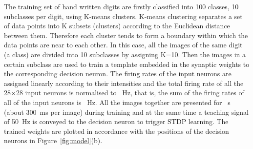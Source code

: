 The training set of \DIFdelbegin {}\DIFdelend \DIFaddbegin {}\DIFaddend hand written digits are firstly classified into 100 classes, 10 subclasses per digit, using K-means clusters.
K-means clustering separates a set of data points into K subsets (clusters) according to the Euclidean distance between them.
Therefore each cluster tends to form a boundary within which the data points are near to each other.
In this case, all the images of the same digit (a class) are divided into 10 subclasses by assigning K=10.
Then the images in a certain subclass are used to train a template embedded in the synaptic weights to the corresponding decision neuron.
The firing rates of the input neurons are assigned linearly according to their intensities and the total firing rate of all the 28$\times$28 input neurons is normalised to \DIFdelbegin {}\DIFdelend \DIFaddbegin {}\DIFaddend ~Hz, that is, the sum of the firing rates of all of the input neurons is \DIFdelbegin {}\DIFdelend \DIFaddbegin {}\DIFaddend ~Hz.
All the images together are presented for \DIFdelbegin {}\DIFdelend \DIFaddbegin {}\DIFaddend ~s (about 300~ms per image) during training and at the same time a teaching signal of 50~Hz is conveyed to the decision neuron to trigger STDP learning.
The trained weights are plotted in accordance with the positions of the decision neurons in Figure~\ref{fig:model}(b).






